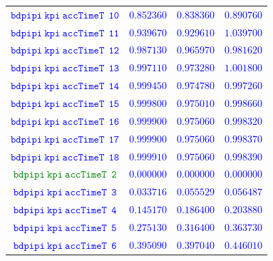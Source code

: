 \documentclass[10pt,a4paper]{article}
\begin{document}
\begin{table}[h!]
{\begin{tabular}{cccc}
\textcolor{blue}{$\mathtt{bdpipi~kpi~accTimeT~~10}$} & \textcolor{blue}{$0.852360$}& \textcolor{blue}{$0.838360$}& \textcolor{blue}{$0.890760$}\\
\textcolor{blue}{$\mathtt{bdpipi~kpi~accTimeT~~11}$} & \textcolor{blue}{$0.939670$}& \textcolor{blue}{$0.929610$}& \textcolor{blue}{$1.039700$}\\
\textcolor{blue}{$\mathtt{bdpipi~kpi~accTimeT~~12}$} & \textcolor{blue}{$0.987130$}& \textcolor{blue}{$0.965970$}& \textcolor{blue}{$0.981620$}\\
\textcolor{blue}{$\mathtt{bdpipi~kpi~accTimeT~~13}$} & \textcolor{blue}{$0.997110$}& \textcolor{blue}{$0.973280$}& \textcolor{blue}{$1.001800$}\\
\textcolor{blue}{$\mathtt{bdpipi~kpi~accTimeT~~14}$} & \textcolor{blue}{$0.999450$}& \textcolor{blue}{$0.974780$}& \textcolor{blue}{$0.997260$}\\
\textcolor{blue}{$\mathtt{bdpipi~kpi~accTimeT~~15}$} & \textcolor{blue}{$0.999800$}& \textcolor{blue}{$0.975010$}& \textcolor{blue}{$0.998660$}\\
\textcolor{blue}{$\mathtt{bdpipi~kpi~accTimeT~~16}$} & \textcolor{blue}{$0.999900$}& \textcolor{blue}{$0.975060$}& \textcolor{blue}{$0.998320$}\\
\textcolor{blue}{$\mathtt{bdpipi~kpi~accTimeT~~17}$} & \textcolor{blue}{$0.999900$}& \textcolor{blue}{$0.975060$}& \textcolor{blue}{$0.998370$}\\
\textcolor{blue}{$\mathtt{bdpipi~kpi~accTimeT~~18}$} & \textcolor{blue}{$0.999910$}& \textcolor{blue}{$0.975060$}& \textcolor{blue}{$0.998390$}\\
\textcolor{Green}{$\mathtt{bdpipi~kpi~accTimeT~~2}$} & \textcolor{blue}{$0.000000$}& \textcolor{blue}{$0.000000$}& \textcolor{blue}{$0.000000$}\\
\textcolor{blue}{$\mathtt{bdpipi~kpi~accTimeT~~3}$} & \textcolor{blue}{$0.033716$}& \textcolor{blue}{$0.055529$}& \textcolor{blue}{$0.056487$}\\
\textcolor{blue}{$\mathtt{bdpipi~kpi~accTimeT~~4}$} & \textcolor{blue}{$0.145170$}& \textcolor{blue}{$0.186400$}& \textcolor{blue}{$0.203880$}\\
\textcolor{blue}{$\mathtt{bdpipi~kpi~accTimeT~~5}$} & \textcolor{blue}{$0.275130$}& \textcolor{blue}{$0.316400$}& \textcolor{blue}{$0.363730$}\\
\textcolor{blue}{$\mathtt{bdpipi~kpi~accTimeT~~6}$} & \textcolor{blue}{$0.395090$}& \textcolor{blue}{$0.397040$}& \textcolor{blue}{$0.446010$}\\

\end{tabular}}
\end{table}
\end{document}
